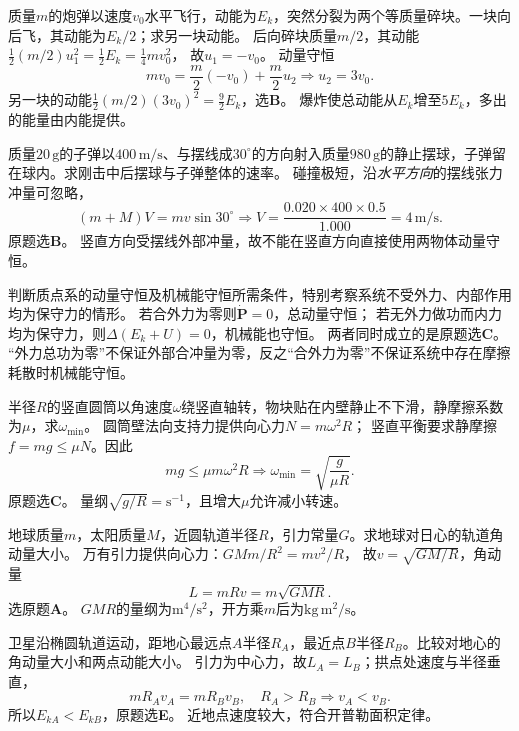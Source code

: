 \problemtext 质量$m$的炮弹以速度$v_0$水平飞行，动能为$E_k$，突然分裂为两个等质量碎块。一块向后飞，其动能为$E_k/2$；求另一块动能。
\workings
后向碎块质量$m/2$，其动能$\frac12(m/2)u_1^2=\frac12 E_k=\frac14 m v_0^2$，
故$u_1=-v_0$。
动量守恒
\[
m v_0=\frac m2(-v_0)+\frac m2u_2
\Longrightarrow u_2=3v_0.
\]
另一块的动能$\frac12(m/2)(3v_0)^2=\frac92E_k$，选\textbf{B}。
\crosscheck 爆炸使总动能从$E_k$增至$5E_k$，多出的能量由内能提供。

\problemtext 质量$20\,\mathrm g$的子弹以$400\,\mathrm{m/s}$、与摆线成$30^\circ$的方向射入质量$980\,\mathrm g$的静止摆球，子弹留在球内。求刚击中后摆球与子弹整体的速率。
\workings
碰撞极短，沿\emph{水平方向}的摆线张力冲量可忽略，
\[
(m+M)V=m v\sin30^\circ
\Longrightarrow
\boxed{V=\frac{0.020\times400\times0.5}{1.000}
=4\,\mathrm{m/s}}.
\]
原题选\textbf{B}。
\crosscheck 竖直方向受摆线外部冲量，故不能在竖直方向直接使用两物体动量守恒。

\problemtext 判断质点系的动量守恒及机械能守恒所需条件，特别考察系统不受外力、内部作用均为保守力的情形。
\workings
若合外力为零则$\dot{\bm P}=0$，总动量守恒；
若无外力做功而内力均为保守力，则$\Delta(E_k+U)=0$，机械能也守恒。
两者同时成立的是原题选\textbf{C}。
\crosscheck “外力总功为零”不保证外部合冲量为零，反之“合外力为零”不保证系统中存在摩擦耗散时机械能守恒。

\problemtext 半径$R$的竖直圆筒以角速度$\omega$绕竖直轴转，物块贴在内壁静止不下滑，静摩擦系数为$\mu$，求$\omega_{\min}$。
\workings
圆筒壁法向支持力提供向心力$N=m\omega^2R$；
竖直平衡要求静摩擦$f=mg\le\mu N$。因此
\[
mg\le\mu m\omega^2R
\Longrightarrow
\boxed{\omega_{\min}=\sqrt{\frac{g}{\mu R}}}.
\]
原题选\textbf{C}。
\crosscheck 量纲$\sqrt{g/R}=\mathrm{s^{-1}}$，且增大$\mu$允许减小转速。

\problemtext 地球质量$m$，太阳质量$M$，近圆轨道半径$R$，引力常量$G$。求地球对日心的轨道角动量大小。
\workings
万有引力提供向心力：$GMm/R^2=mv^2/R$，
故$v=\sqrt{GM/R}$，角动量
\[
\boxed{L=mRv=m\sqrt{GMR}}.
\]
选原题\textbf{A}。
\crosscheck $GMR$的量纲为$\mathrm{m^4/s^2}$，开方乘$m$后为$\mathrm{kg\,m^2/s}$。

\problemtext 卫星沿椭圆轨道运动，距地心最远点$A$半径$R_A$，最近点$B$半径$R_B$。比较对地心的角动量大小和两点动能大小。
\workings
引力为中心力，故$L_A=L_B$；拱点处速度与半径垂直，
\[
mR_Av_A=mR_Bv_B,\quad R_A>R_B
\Longrightarrow v_A<v_B.
\]
所以$E_{kA}<E_{kB}$，原题选\textbf{E}。
\crosscheck 近地点速度较大，符合开普勒面积定律。

